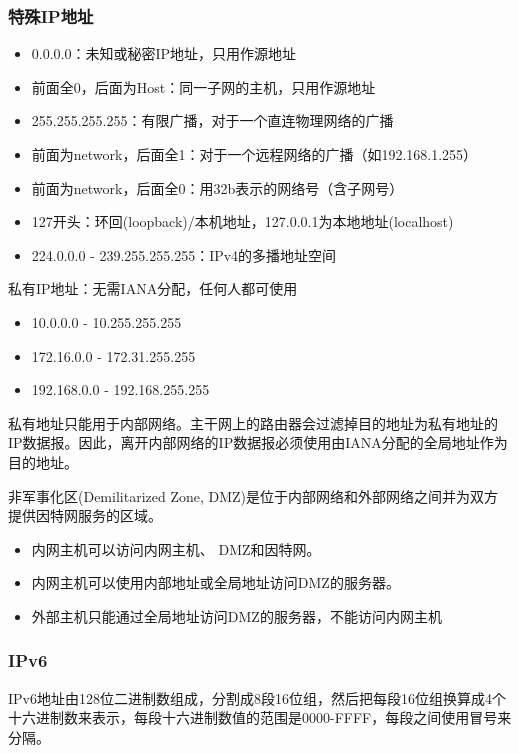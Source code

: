 \subsubsection{特殊IP地址}
\begin{itemize}
	\item 0.0.0.0：未知或秘密IP地址，只用作源地址
	\item 前面全0，后面为Host：同一子网的主机，只用作源地址
	\item 255.255.255.255：有限广播，对于一个直连物理网络的广播
	\item 前面为network，后面全1：对于一个远程网络的广播（如192.168.1.255）
	\item 前面为network，后面全0：用32b表示的网络号（含子网号）
	\item 127开头：环回(loopback)/本机地址，127.0.0.1为本地地址(localhost)
	\item 224.0.0.0 - 239.255.255.255：IPv4的多播地址空间
\end{itemize}

私有IP地址：无需IANA分配，任何人都可使用
\begin{itemize}
	\item 10.0.0.0 - 10.255.255.255
	\item 172.16.0.0 - 172.31.255.255
	\item 192.168.0.0 - 192.168.255.255
\end{itemize}
私有地址只能用于内部网络。主干网上的路由器会过滤掉目的地址为私有地址的IP数据报。因此，离开内部网络的IP数据报必须使用由IANA分配的全局地址作为目的地址。

非军事化区(Demilitarized Zone, DMZ)是位于内部网络和外部网络之间并为双方提供因特网服务的区域。
\begin{itemize}
\item 内网主机可以访问内网主机、 DMZ和因特网。
\item 内网主机可以使用内部地址或全局地址访问DMZ的服务器。
\item 外部主机只能通过全局地址访问DMZ的服务器，不能访问内网主机
\end{itemize}

\subsubsection{IPv6}
IPv6地址由128位二进制数组成，分割成8段16位组，然后把每段16位组换算成4个十六进制数来表示，每段十六进制数值的范围是0000-FFFF，每段之间使用冒号来分隔。

